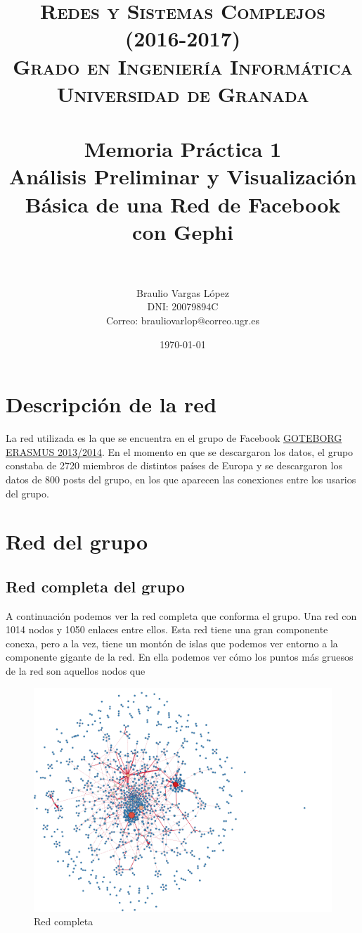 \documentclass[paper=a4, fontsize=11pt]{article} %
\title{ 
\normalfont \normalsize 
\textsc{{\bf Redes y Sistemas Complejos (2016-2017)} \\ Grado en Ingeniería Informática \\ Universidad de Granada} \\ [25pt] %
\horrule{0.5pt} \\[0.4cm] %
\huge Memoria Práctica 1 \\ Análisis Preliminar y Visualización Básica de una Red de Facebook con Gephi\\%
\horrule{2pt} \\[0.5cm] %
}
\author{Braulio Vargas López\\DNI: 20079894C\\Correo: brauliovarlop@correo.ugr.es} %
\date{\normalsize\today} %
\numberwithin{equation}{section} %
\numberwithin{figure}{section} %
\numberwithin{table}{section} %
\begin{document}
\maketitle %
\newpage %

\tableofcontents %
{}

\section{Descripción de la red}

La red utilizada es la que se encuentra en el grupo de Facebook \href{https://www.facebook.com/groups/goteborgerasmus1314/?fref=ts}{GOTEBORG ERASMUS 2013/2014}. En el momento en que se descargaron los datos, el grupo constaba de 2720 miembros de distintos países de Europa y se descargaron los datos de 800 posts del grupo, en los que aparecen las conexiones entre los usarios del grupo.

\section{Red del grupo}

\subsection{Red completa del grupo}

A continuación podemos ver la red completa que conforma el grupo. Una red con 1014 nodos y 1050 enlaces entre ellos. Esta red tiene una gran componente conexa, pero a la vez, tiene un montón de islas que podemos ver entorno a la componente gigante de la red. En ella podemos ver cómo los puntos más gruesos de la red son aquellos nodos que 

\begin{figure}[H]
  \centering
  \includegraphics[scale=0.6]{RedCompleta}
  \caption{Red completa}
  \label{red_cmp}
\end{figure}
\end{document}
